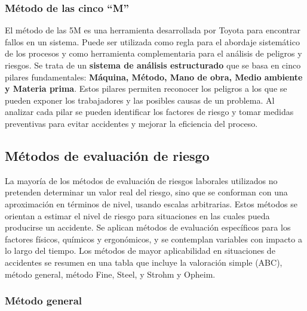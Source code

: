 \subsubsection{Método de las cinco ``M''}

El método de las 5M es una herramienta desarrollada por Toyota para encontrar
fallos en un sistema. Puede ser utilizada como regla para el abordaje
sistemático de los procesos y como herramienta complementaria para el análisis
de peligros y riesgos. Se trata de un \textbf{sistema de análisis estructurado}
que se basa en cinco pilares fundamentales: \textbf{Máquina, Método, Mano de
	obra, Medio ambiente y Materia prima}. Estos pilares permiten reconocer los
peligros a los que se pueden exponer los trabajadores y las posibles causas de
un problema. Al analizar cada pilar se pueden identificar los factores de
riesgo y tomar medidas preventivas para evitar accidentes y mejorar la
eficiencia del proceso.

\subsection{Métodos de evaluación de riesgo}

La mayoría de los métodos de evaluación de riesgos laborales utilizados no
pretenden determinar un valor real del riesgo, sino que se conforman con una
aproximación en términos de nivel, usando escalas arbitrarias. Estos métodos
se orientan a estimar el nivel de riesgo para situaciones en las cuales pueda
producirse un accidente. Se aplican métodos de evaluación específicos para los
factores físicos, químicos y ergonómicos, y se contemplan variables con impacto
a lo largo del tiempo. Los métodos de mayor aplicabilidad en situaciones de
accidentes se resumen en una tabla que incluye la valoración simple (ABC),
método general, método Fine, Steel, y Strohm y Opheim.

\subsubsection{Método general}


